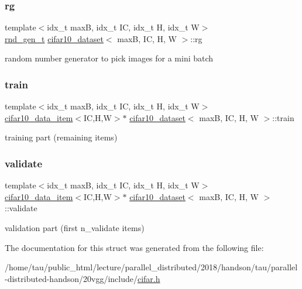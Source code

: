 \subsubsection{\texorpdfstring{rg}{rg}}
{\footnotesize\ttfamily template$<$idx\+\_\+t maxB, idx\+\_\+t IC, idx\+\_\+t H, idx\+\_\+t W$>$ \\
\hyperlink{structrnd__gen__t}{rnd\+\_\+gen\+\_\+t} \hyperlink{structcifar10__dataset}{cifar10\+\_\+dataset}$<$ maxB, IC, H, W $>$\+::rg}

random number generator to pick images for a mini batch \mbox{\label{structcifar10__dataset_a0c64c36b940f91c63a9d5f89360f5335}} 
\subsubsection{\texorpdfstring{train}{train}}
{\footnotesize\ttfamily template$<$idx\+\_\+t maxB, idx\+\_\+t IC, idx\+\_\+t H, idx\+\_\+t W$>$ \\
\hyperlink{structcifar10__data__item}{cifar10\+\_\+data\+\_\+item}$<$IC,H,W$>$$\ast$ \hyperlink{structcifar10__dataset}{cifar10\+\_\+dataset}$<$ maxB, IC, H, W $>$\+::train}

training part (remaining items) \mbox{\label{structcifar10__dataset_a3264803c2eb493dabaedb7eca4d7725f}} 
\subsubsection{\texorpdfstring{validate}{validate}}
{\footnotesize\ttfamily template$<$idx\+\_\+t maxB, idx\+\_\+t IC, idx\+\_\+t H, idx\+\_\+t W$>$ \\
\hyperlink{structcifar10__data__item}{cifar10\+\_\+data\+\_\+item}$<$IC,H,W$>$$\ast$ \hyperlink{structcifar10__dataset}{cifar10\+\_\+dataset}$<$ maxB, IC, H, W $>$\+::validate}

validation part (first n\+\_\+validate items) 

The documentation for this struct was generated from the following file\+:\begin{DoxyCompactItemize}
\item 
/home/tau/public\+\_\+html/lecture/parallel\+\_\+distributed/2018/handson/tau/parallel-\/distributed-\/handson/20vgg/include/\hyperlink{cifar_8h}{cifar.\+h}\end{DoxyCompactItemize}
